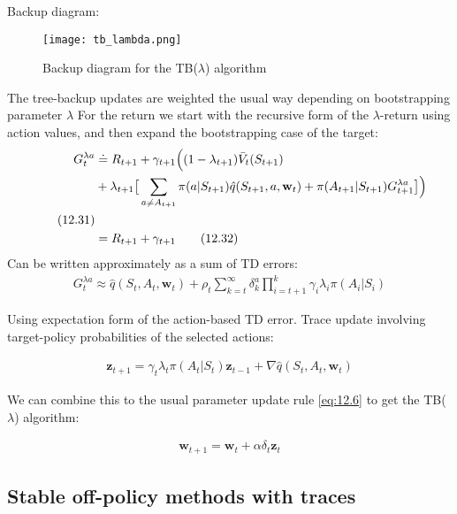 \documentclass[sutton_barto_notes.tex]{subfiles}
\begin{document}
 Backup diagram: 

\begin{figure}[h!]
    \centering
     \texttt{[image: tb\_lambda.png]}
    \caption{ Backup diagram for the TB($\lambda$) algorithm }
\end{figure}


 The tree-backup updates are weighted the usual way depending on bootstrapping parameter $\lambda$
For the return we start with the recursive form of the $\lambda$-return using action values, and then expand the bootstrapping case of the target: 
\begin{align*}
\hspace*{-10cm}G_t^{\lambda a} & \doteq R_{t+1} + \gamma_{t+1} \Big( (1 - \lambda_{t+1}) \bar{V}_t(S_{t+1}) \\
& + \lambda_{t+1} \big[ \sum_{a \neq A_{t+1}} \pi(a|S_{t+1}) \hat{q}(S_{t+1}, a, \mathbf{w}_t) + \pi(A_{t+1}| S_{t+1}) G_{t+1}^{\lambda a} \big] \Big)\\\label{eq:12.31}\tag{12.31}\\
& = R_{t+1} + \gamma_{t+1} \label{eq:12.32}\tag{12.32}
\end{align*} 
 Can be written approximately as a sum of TD errors: 
\begin{align}
G_t^{\lambda a} \approx \hat{q}(S_{t}, A_t, \mathbf{w}_{t}) + \rho_t \sum_{k=t}^{\infty} \delta_k^a \prod_{i=t+1}^k \gamma_i \lambda_i \pi(A_i|S_i) \label{eq:12.33}\tag{12.33}
\end{align}

 Using expectation form of the action-based TD error.
Trace update involving target-policy probabilities of the selected actions: 

\begin{align}
\mathbf{z}_{t+1} = \gamma_t \lambda_t \pi(A_t| S_t) \mathbf{z}_{t-1} + \nabla \hat{q}(S_t, A_t, \mathbf{w}_{t}) \label{eq:12.34}\tag{12.34}
\end{align}

 We can combine this to the usual parameter update rule \ref{eq:12.6} to get the TB($\lambda$) algorithm: 

\begin{align}\mathbf{w}_{t+1} = \mathbf{w}_t + \alpha \delta_t \mathbf{z}_t\end{align}

\subsection{Stable off-policy methods with traces}
\end{document}
